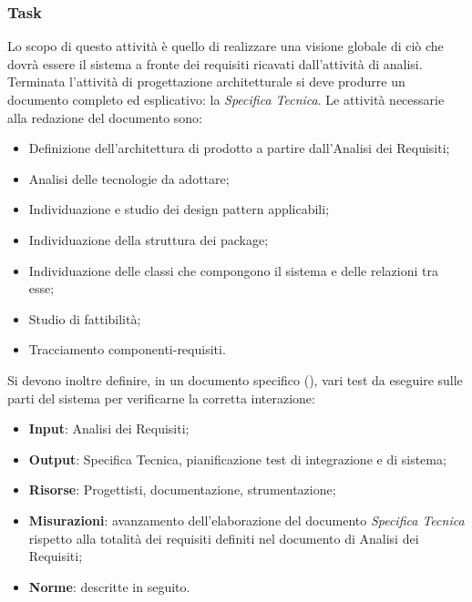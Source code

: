 \subsubsection{Task}
Lo scopo di questo attività è quello di realizzare una visione globale di ciò che dovrà essere il sistema a fronte dei requisiti ricavati dall’attività di analisi.
Terminata l’attività di progettazione architetturale si deve produrre un documento completo ed esplicativo: la \emph{Specifica Tecnica}.
Le attività necessarie alla redazione del documento sono:
\begin{itemize}
\item Definizione dell’architettura di prodotto a partire dall’Analisi dei Requisiti;
\item Analisi delle tecnologie da adottare;
\item Individuazione e studio dei design pattern applicabili;
\item Individuazione della struttura dei package;
\item Individuazione delle classi che compongono il sistema e delle relazioni tra esse;
\item Studio di fattibilità;
\item Tracciamento componenti-requisiti.
\end{itemize}
Si devono inoltre definire, in un documento specifico  (\href{run:../../Esterni/\fPianoDiQualifica}{\fEscapePianoDiQualifica}), vari
test da eseguire sulle parti del sistema per verificarne la corretta interazione:
\begin{itemize}
\item \textbf{Input}: Analisi dei Requisiti;
\item \textbf{Output}: Specifica Tecnica, pianificazione test di integrazione e di sistema;
\item \textbf{Risorse}: Progettisti, documentazione, strumentazione;
\item \textbf{Misurazioni}: avanzamento dell'elaborazione del documento \emph{Specifica Tecnica} rispetto alla totalità dei requisiti definiti nel documento di Analisi dei Requisiti;
\item \textbf{Norme}: descritte in seguito.
\end{itemize}
       
